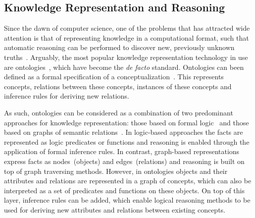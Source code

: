 	\subsection{Knowledge Representation and Reasoning}

    Since the dawn of computer science, one of the problems that has attracted wide attention
    is that of representing knowledge in a computational format, such that automatic reasoning
    can be performed to discover new, previously unknown truths~\cite{sowa2000knowledge}.
    Arguably, the most popular knowledge representation technology in use are
    ontologies~\cite{guarino1995formal}, which have
    become the \emph{de facto} standard.
	Ontologies can been defined as a formal specification of a conceptualization~\cite{asuncion2003}.
    This represents concepts, relations between these concepts, instances of these concepts and inference rules
    for deriving new relations.

    As such, ontologies can be considered as a combination of two predominant approaches
    for knowledge representation: those based on formal logic~\cite{brachman1992knowledge}
    and those based on graphs of semantic relations~\cite{chein2008graph}.
    In logic-based approaches the facts are represented as logic predicates or functions
    and reasoning is enabled through the application of formal inference rules.
    In contrast, graph-based representations express facts as nodes~(objects)
    and edges~(relations) and reasoning is built on top of graph traversing methods.
    However, in ontologies objects and their attributes and relations are represented in a graph of concepts,
    which can also be interpreted as a set of predicates and functions on these objects.
    On top of this layer, inference rules can be added,
    which enable logical reasoning methods to be used for deriving new attributes and
    relations between existing concepts.

